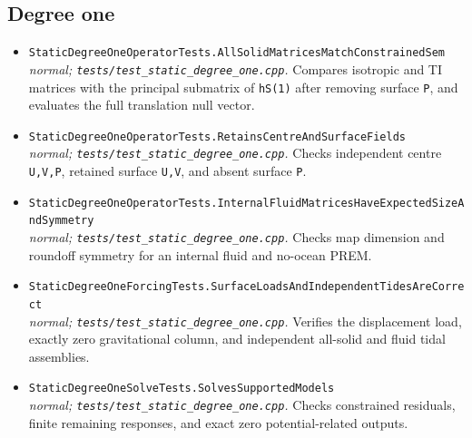 \subsection*{Degree one}
\begin{itemize}[leftmargin=1.4em,itemsep=0.35em]
\item {\footnotesize\texttt{StaticDegreeOneOperatorTests.AllSolidMatricesMatchConstrainedSem}}\\
\emph{normal; \texttt{tests/test\_static\_degree\_one.cpp}.} Compares isotropic and TI matrices with the principal submatrix of \texttt{hS(1)} after removing surface \texttt{P}, and evaluates the full translation null vector.
\item {\footnotesize\texttt{StaticDegreeOneOperatorTests.RetainsCentreAndSurfaceFields}}\\
\emph{normal; \texttt{tests/test\_static\_degree\_one.cpp}.} Checks independent centre \texttt{U,V,P}, retained surface \texttt{U,V}, and absent surface \texttt{P}.
\item {\footnotesize\texttt{StaticDegreeOneOperatorTests.InternalFluidMatricesHaveExpectedSizeAndSymmetry}}\\
\emph{normal; \texttt{tests/test\_static\_degree\_one.cpp}.} Checks map dimension and roundoff symmetry for an internal fluid and no-ocean PREM.
\item {\footnotesize\texttt{StaticDegreeOneForcingTests.SurfaceLoadsAndIndependentTidesAreCorrect}}\\
\emph{normal; \texttt{tests/test\_static\_degree\_one.cpp}.} Verifies the displacement load, exactly zero gravitational column, and independent all-solid and fluid tidal assemblies.
\item {\footnotesize\texttt{StaticDegreeOneSolveTests.SolvesSupportedModels}}\\
\emph{normal; \texttt{tests/test\_static\_degree\_one.cpp}.} Checks constrained residuals, finite remaining responses, and exact zero potential-related outputs.
\end{itemize}
